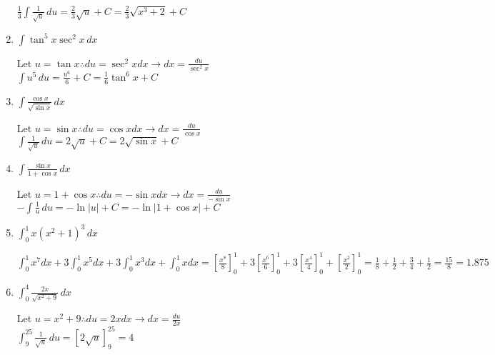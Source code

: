 \documentclass[10pt, letterpaper]{report}
\begin{document}
\begin{enumerate}
    $\frac{1}{3}\int{\frac{1}{\sqrt{u}}}\,du=
    \frac{2}{3}\sqrt{u}+C=\frac{2}{3}\sqrt{x^{3}+2}+C$ \\

  \item{$\int{\tan^{5}{x}\sec^{2}{x}}\,dx$ \\}

    Let $u=\tan{x}\therefore du=\sec^{2}{x}dx\rightarrow dx=\frac{du}{\sec^{2}{x}}$ \\

    $\int{u^{5}}\,du=\frac{u^{6}}{6}+C=\frac{1}{6}\tan^{6}{x}+C$ \\

  \item{$\int{\frac{\cos{x}}{\sqrt{\sin{x}}}}\,dx$ \\}

    Let $u=\sin{x}\therefore du=\cos{x}dx\rightarrow dx=\frac{du}{\cos{x}}$ \\

    $\int{\frac{1}{\sqrt{u}}}\,du=2\sqrt{u}+C=2\sqrt{\sin{x}}+C$ \\

  \item{$\int{\frac{\sin{x}}{1+\cos{x}}}\,dx$ \\}

    Let $u=1+\cos{x}\therefore du=-\sin{x}dx\rightarrow dx=\frac{du}{-\sin{x}}$ \\

    $-\int{\frac{1}{u}}\,du=-\ln{|u|}+C=-\ln{|1+\cos{x}|}+C$ \\

  \item{$\int_{0}^{1}{x\left( x^{2}+1\right)^{3}}\,dx$ \\}

    $\int_{0}^{1}x^7dx+3\int_{0}^{1}x^5dx+3\int_{0}^{1}x^3dx+\int_{0}^{1}xdx=
    [\frac{x^8}{8}]_{0}^{1}+3[\frac{x^6}{6}]_{0}^{1}+3[\frac{x^4}{4}]_{0}^{1}+[\frac{x^2}{2}]_{0}^{1}=
    \frac{1}{8}+\frac{1}{2}+\frac{3}{4}+\frac{1}{2}=\frac{15}{8}=1.875$ \\

  \item{$\int_{0}^{4}{\frac{2x}{\sqrt{x^{2}+9}}}\,dx$ \\}

    Let $u=x^{2}+9\therefore du=2xdx\rightarrow dx=\frac{du}{2x}$ \\

    $\int_{9}^{25}{\frac{1}{\sqrt{u}}}\,du=[2\sqrt{u}]_{9}^{25}=4$ \\


\end{enumerate}
\end{document}
